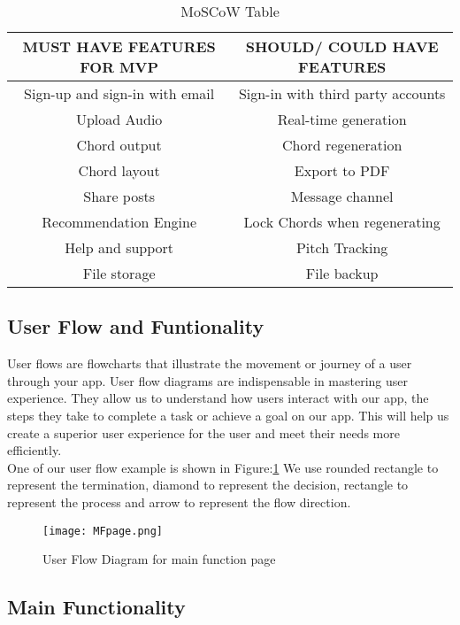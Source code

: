 \begin{table}[ht]
\centering
\begin{tabular}{ |c|c| } 
 \hline
\textbf{MUST HAVE FEATURES FOR MVP} & \textbf{SHOULD/ COULD HAVE FEATURES}\\ 
 \hline
 Sign-up and sign-in with email & Sign-in with third party accounts \\ 
 \hline
 Upload Audio & Real-time generation \\ 
 \hline
 Chord output & Chord regeneration \\ 
 \hline
 Chord layout &  Export to PDF \\ 
 \hline
 Share posts & Message channel \\ 
 \hline
 Recommendation Engine &  Lock Chords when regenerating\\ 
 \hline
 Help and support &  Pitch Tracking\\ 
 \hline
 File storage& File backup \\ 
 \hline
 \end{tabular}
 \caption{MoSCoW Table}
 \centering
 \end{table}
 
 \subsection{User Flow and Funtionality}
User flows are flowcharts that illustrate the movement or journey of a user through your app. User flow diagrams are indispensable in mastering user experience. 
They allow us to understand how users interact with our app, the steps they take to complete a task or achieve a goal on our app. This will help us create a superior user experience for the user and meet their needs more efficiently.  
\\One of our user flow example is shown in Figure:\ref{flowchartmain}
We use rounded rectangle to represent the termination, diamond to represent the decision, rectangle to represent the process and arrow to represent the flow direction.

\begin{figure}[ht]
\centering
\texttt{[image: MFpage.png]}
\caption{User Flow Diagram for main function page}
\label{flowchartmain}
\end{figure}


\subsection*{Main Functionality}

